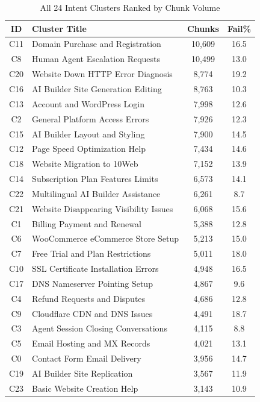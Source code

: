 \documentclass[conference]{IEEEtran}
\begin{document}
\begin{table}[!t]
\caption{All 24 Intent Clusters Ranked by Chunk Volume}
\label{tab:clusters}
\centering
\begin{tabular}{clcc}
\toprule
ID & Cluster Title & Chunks & Fail\% \\
\midrule
C11 & Domain Purchase and Registration      & 10{,}609 & 16.5 \\
C8  & Human Agent Escalation Requests       & 10{,}499 & 13.0 \\
C20 & Website Down HTTP Error Diagnosis     &  8{,}774 & 19.2 \\
C16 & AI Builder Site Generation Editing    &  8{,}763 & 10.3 \\
C13 & Account and WordPress Login           &  7{,}998 & 12.6 \\
C2  & General Platform Access Errors        &  7{,}926 & 12.3 \\
C15 & AI Builder Layout and Styling         &  7{,}900 & 14.5 \\
C12 & Page Speed Optimization Help          &  7{,}434 & 14.6 \\
C18 & Website Migration to 10Web            &  7{,}152 & 13.9 \\
C14 & Subscription Plan Features Limits     &  6{,}573 & 14.1 \\
C22 & Multilingual AI Builder Assistance    &  6{,}261 &  8.7 \\
C21 & Website Disappearing Visibility Issues &  6{,}068 & 15.6 \\
C1  & Billing Payment and Renewal           &  5{,}388 & 12.8 \\
C6  & WooCommerce eCommerce Store Setup     &  5{,}213 & 15.0 \\
C7  & Free Trial and Plan Restrictions      &  5{,}011 & 18.0 \\
C10 & SSL Certificate Installation Errors   &  4{,}948 & 16.5 \\
C17 & DNS Nameserver Pointing Setup         &  4{,}867 &  9.6 \\
C4  & Refund Requests and Disputes          &  4{,}686 & 12.8 \\
C9  & Cloudflare CDN and DNS Issues         &  4{,}491 & 18.7 \\
C3  & Agent Session Closing Conversations   &  4{,}115 &  8.8 \\
C5  & Email Hosting and MX Records          &  4{,}021 & 13.1 \\
C0  & Contact Form Email Delivery           &  3{,}956 & 14.7 \\
C19 & AI Builder Site Replication           &  3{,}567 & 11.9 \\
C23 & Basic Website Creation Help           &  3{,}143 & 10.9 \\
\bottomrule
\end{tabular}
\end{table}
\end{document}
